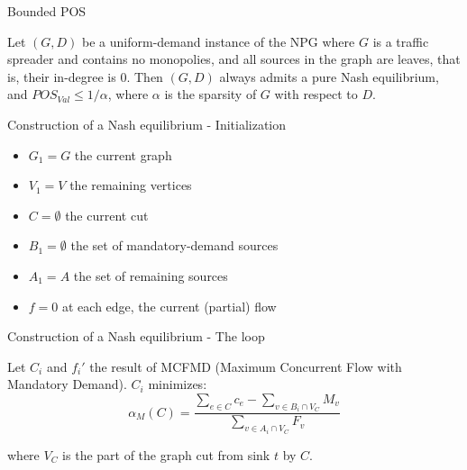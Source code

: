 \documentclass{beamer}
\begin{document}
\begin{frame}{Bounded POS}
  \begin{theorem}
    Let $(G, D)$ be a uniform-demand instance of the NPG where $G$
is a traffic spreader and contains no monopolies, and all sources in the graph
are leaves, that is, their in-degree is 0. Then $(G, D)$ always admits a pure Nash
equilibrium, and $POS_{Val} \leq 1/\alpha$, where $\alpha$ is the sparsity of $G$ with respect to $D$.
  \end{theorem}
\end{frame}


\begin{frame}{Construction of a Nash equilibrium - Initialization}

\begin{itemize}
\item $G_1 = G$ the current graph
\item $V_1 = V$ the remaining vertices
\item $C = \emptyset$ the current cut
\item $B_1 = \emptyset$ the set of mandatory-demand sources
\item $A_1 = A$ the set of remaining sources
\item $f = 0$ at each edge, the current (partial) flow
\end{itemize}

\end{frame}

\begin{frame}{Construction of a Nash equilibrium - The loop}

Let $C_i$ and $f_i'$ the result of MCFMD (Maximum Concurrent Flow with Mandatory Demand). $C_i$ minimizes:
\begin{equation}
\alpha_M(C) = \frac{\sum_{e\in C}c_e-\sum_{v \in B_i\cap V_C}M_v}{\sum_{v \in A_i \cap V_C}F_v}
\end{equation}

where $V_C$ is the part of the graph cut from sink $t$ by $C$.

\end{frame}
\end{document}
